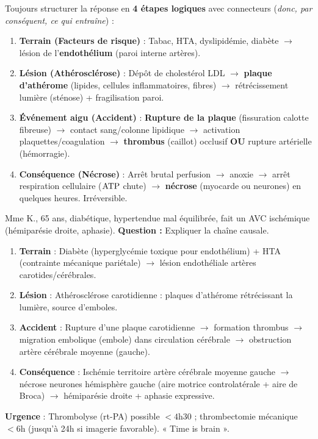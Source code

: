 \documentclass[11pt]{article}
\begin{document}
\begin{methode}
Toujours structurer la réponse en \textbf{4 étapes logiques} avec connecteurs (\emph{donc, par conséquent, ce qui entraîne}) :
\begin{enumerate}
\item \textbf{Terrain (Facteurs de risque)} : Tabac, HTA, dyslipidémie, diabète $\rightarrow$ lésion de l'\textbf{endothélium} (paroi interne artères).
\item \textbf{Lésion (Athérosclérose)} : Dépôt de cholestérol LDL $\rightarrow$ \textbf{plaque d'athérome} (lipides, cellules inflammatoires, fibres) $\rightarrow$ rétrécissement lumière (sténose) + fragilisation paroi.
\item \textbf{Événement aigu (Accident)} : \textbf{Rupture de la plaque} (fissuration calotte fibreuse) $\rightarrow$ contact sang/colonne lipidique $\rightarrow$ activation plaquettes/coagulation $\rightarrow$ \textbf{thrombus} (caillot) occlusif \textbf{OU} rupture artérielle (hémorragie).
\item \textbf{Conséquence (Nécrose)} : Arrêt brutal perfusion $\rightarrow$ anoxie $\rightarrow$ arrêt respiration cellulaire ($\ce{ATP}$ chute) $\rightarrow$ \textbf{nécrose} (myocarde ou neurones) en quelques heures. Irréversible.
\end{enumerate}
\end{methode}

\begin{exoresolu}
Mme K., 65 ans, diabétique, hypertendue mal équilibrée, fait un AVC ischémique (hémiparésie droite, aphasie).
\textbf{Question :} Expliquer la chaîne causale.
\tcblower
\begin{enumerate}
\item \textbf{Terrain} : Diabète (hyperglycémie toxique pour endothélium) + HTA (contrainte mécanique pariétale) $\rightarrow$ lésion endothéliale artères carotides/cérébrales.
\item \textbf{Lésion} : Athérosclérose carotidienne : plaques d'athérome rétrécissant la lumière, source d'emboles.
\item \textbf{Accident} : Rupture d'une plaque carotidienne $\rightarrow$ formation thrombus $\rightarrow$ migration embolique (embole) dans circulation cérébrale $\rightarrow$ obstruction artère cérébrale moyenne (gauche).
\item \textbf{Conséquence} : Ischémie territoire artère cérébrale moyenne gauche $\rightarrow$ nécrose neurones hémisphère gauche (aire motrice controlatérale + aire de Broca) $\rightarrow$ hémiparésie droite + aphasie expressive.
\end{enumerate}
\textbf{Urgence} : Thrombolyse (rt-PA) possible $< 4$h30 ; thrombectomie mécanique $< 6$h (jusqu'à 24h si imagerie favorable). « Time is brain ».
\end{exoresolu}
\end{document}
